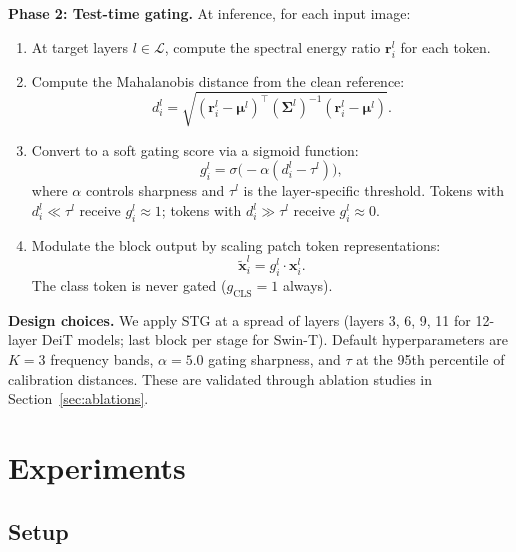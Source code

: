 \documentclass{article}
\newcommand{\methodname}{STG}
\begin{document}
\textbf{Phase 2: Test-time gating.} At inference, for each input image:
\begin{enumerate}
    \item At target layers $l \in \mathcal{L}$, compute the spectral energy ratio $\mathbf{r}_i^l$ for each token.

    \item Compute the Mahalanobis distance from the clean reference:
    \begin{equation}
        d_i^l = \sqrt{(\mathbf{r}_i^l - \boldsymbol{\mu}^l)^\top (\boldsymbol{\Sigma}^l)^{-1} (\mathbf{r}_i^l - \boldsymbol{\mu}^l)}.
    \end{equation}

    \item Convert to a soft gating score via a sigmoid function:
    \begin{equation}
        g_i^l = \sigma\bigl(-\alpha(d_i^l - \tau^l)\bigr),
    \end{equation}
    where $\alpha$ controls sharpness and $\tau^l$ is the layer-specific threshold. Tokens with $d_i^l \ll \tau^l$ receive $g_i^l \approx 1$; tokens with $d_i^l \gg \tau^l$ receive $g_i^l \approx 0$.

    \item Modulate the block output by scaling patch token representations:
    \begin{equation}
        \tilde{\mathbf{x}}_i^l = g_i^l \cdot \mathbf{x}_i^l.
    \end{equation}
    The class token is never gated ($g_\text{CLS} = 1$ always).
\end{enumerate}

\textbf{Design choices.} We apply \methodname{} at a spread of layers (layers 3, 6, 9, 11 for 12-layer DeiT models; last block per stage for Swin-T). Default hyperparameters are $K{=}3$ frequency bands, $\alpha{=}5.0$ gating sharpness, and $\tau$ at the 95th percentile of calibration distances. These are validated through ablation studies in Section~\ref{sec:ablations}.

\section{Experiments}
\label{sec:experiments}

\subsection{Setup}
\label{sec:setup}
\end{document}

